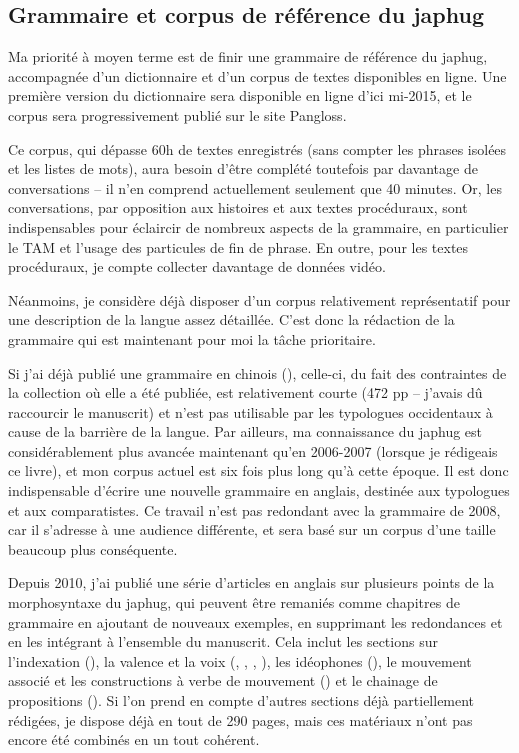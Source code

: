 \documentclass[oldfontcommands,oneside,a4paper,11pt]{article}
\begin{document}
\subsection{Grammaire et corpus de référence du japhug}
Ma priorité à moyen terme est de finir une grammaire de référence du japhug, accompagnée d'un dictionnaire et d'un corpus de textes disponibles en ligne. Une première version du dictionnaire sera disponible en ligne d'ici mi-2015, et le corpus sera progressivement publié sur le site Pangloss. 

Ce corpus, qui dépasse 60h de textes enregistrés (sans compter les phrases isolées et les listes de mots), aura besoin d'être complété toutefois par davantage de conversations -- il n'en comprend actuellement seulement que 40 minutes. Or, les conversations, par opposition aux histoires et aux textes procéduraux, sont indispensables pour éclaircir de nombreux aspects de la grammaire, en particulier le TAM et l'usage des particules de fin de phrase. En outre, pour les textes procéduraux, je compte collecter davantage de données vidéo. 

Néanmoins, je considère déjà disposer d'un corpus relativement représentatif pour une description de la langue assez détaillée. C'est donc la rédaction de la grammaire qui est maintenant pour moi la tâche prioritaire.



Si j'ai déjà publié une grammaire en chinois (\citealt{jacques08zh}), celle-ci, du fait des contraintes de la collection où elle a été publiée, est relativement courte (472 pp -- j'avais dû raccourcir le manuscrit) et n'est pas utilisable par les typologues occidentaux à cause de la barrière de la langue. Par ailleurs, ma connaissance du japhug est considérablement plus avancée maintenant qu'en 2006-2007 (lorsque je rédigeais ce livre), et mon corpus actuel est six fois plus long qu'à cette époque. Il est donc indispensable d'écrire une nouvelle grammaire en anglais, destinée aux typologues et aux comparatistes.  Ce travail n'est pas redondant avec la grammaire de 2008, car il s'adresse à une audience différente, et sera basé sur un corpus d'une taille beaucoup plus conséquente.

Depuis 2010, j'ai publié une série d'articles en anglais sur plusieurs points de la morphosyntaxe du japhug, qui peuvent être remaniés comme chapitres de grammaire en ajoutant de nouveaux exemples, en supprimant les redondances et en les intégrant à l'ensemble du manuscrit. Cela inclut les sections sur l'indexation (\citealt{jacques10inverse}), la valence et la voix (\citealt{jacques12demotion}, \citealt{jacques12incorp}, \citealt{jacques13tropative},   \citealt{jacques14antipassive}), les idéophones (\citealt{japhug14ideophones}), le mouvement associé et les constructions à verbe de mouvement (\citealt{jacques13harmonization}) et le chainage de propositions (\citealt{jacques14linking}). Si l'on prend en compte d'autres sections déjà partiellement rédigées, je dispose déjà en tout de 290 pages, mais ces matériaux n'ont pas encore été combinés en un  tout cohérent.
\end{document}
